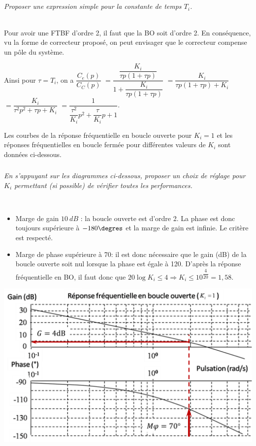 \documentclass[10pt,fleqn]{article} %
\begin{document}
\begin{multicols}{2}
\subparagraph{}
\textit{Proposer une expression simple pour la constante de temps $T_i$.}
\ifprof
\begin{corrige} ~\\
Pour avoir une FTBF d'ordre 2, il faut que la BO soit d'ordre 2. En conséquence, vu la forme de correcteur proposé, on peut envisager que le correcteur compense un pôle du système. 

Ainsi pour $\tau=T_i$, on a $\dfrac{C_e(p)}{C_C(p)}$
$=\dfrac{\dfrac{K_i}{\tau p\left(1+\tau p \right)}}{1+\dfrac{K_i}{\tau p\left(1+\tau p \right)}}$
$=\dfrac{K_i}{\tau p\left(1+\tau p \right)+ K_i}$
$=\dfrac{K_i}{\tau^2 p^2+\tau p+ K_i}$
$=\dfrac{1}{\dfrac{\tau^2}{K_i} p^2+\dfrac{\tau}{K_i} p+ 1}$.
\end{corrige}
\else
\fi


\ifprof
\else
Les courbes de la réponse fréquentielle en boucle ouverte pour
$K_i=1$ et les réponses fréquentielles en boucle fermée pour différentes valeurs de $K_i$ sont données ci-dessous.
\fi

\subparagraph{}
\textit{En s'appuyant sur les diagrammes ci-dessous, proposer un choix de réglage pour $K_i$ permettant (si possible) de vérifier toutes les performances.}
\ifprof
\begin{corrige}~\\
\begin{itemize}
\item Marge de gain $\SI{10}{dB}$ :  la boucle ouverte est d'ordre 2. La phase est donc toujours supérieure à $-180\degres$ et la marge de gain est infinie. Le critère est respecté. 
\item Marge de phase supérieure à 70\degres : il est donc nécessaire que le gain (dB) de la boucle ouverte soit nul lorsque la phase est égale à 120\degres. D'après la réponse fréquentielle en BO, il faut donc que $20\log K_i \leq 4 \Rightarrow K_i \leq  10^{\dfrac{4}{20}}=1,58$.
\end{itemize}

\begin{center}
\includegraphics[width=.5\linewidth]{images/bo_cor}
\end{center}


\end{corrige}
\end{multicols}
\end{document}
